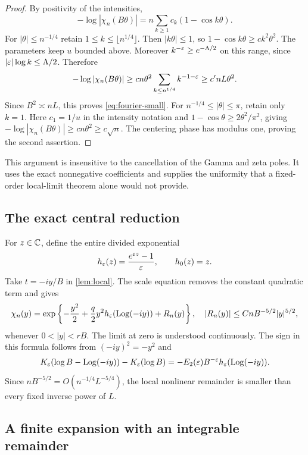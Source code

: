 \begin{proof}
By positivity of the intensities,
\[
 -\log|\chi_n(B\theta)|
  =n\sum_{k\ge1}c_k(1-\cos k\theta).
\]
For $|\theta|\le n^{-1/4}$ retain $1\le k\le\lfloor n^{1/4}\rfloor$.
Then $|k\theta|\le1$, so $1-\cos k\theta\ge c k^2\theta^2$.
The parameters keep $u$ bounded above. Moreover
$k^{-\varepsilon}\ge e^{-\Lambda/2}$ on this range, since
$|\varepsilon|\log k\le\Lambda/2$. Therefore
\[
 -\log|\chi_n(B\theta)|
 \ge c n\theta^2\sum_{k\le n^{1/4}}k^{-1-\varepsilon}
 \ge c' nL\theta^2.
\]
Since $B^2\asymp nL$, this proves \eqref{eq:fourier-small}.
For $n^{-1/4}\le|\theta|\le\pi$, retain only $k=1$.
Here $c_1=1/u$ in the intensity notation and
$1-\cos\theta\ge2\theta^2/\pi^2$, giving
$-\log|\chi_n(B\theta)|\ge c n\theta^2\ge c\sqrt n$.
The centering phase has modulus one, proving the second assertion.
\end{proof}

This argument is insensitive to the cancellation of the Gamma and
zeta poles. It uses the exact nonnegative coefficients and supplies
the uniformity that a fixed-order local-limit theorem alone would
not provide.

\subsection{The exact central reduction}

For $z\in\mathbb C$, define the entire divided exponential
\begin{equation}\label{eq:h-epsilon}
 h_\varepsilon(z)=\frac{e^{\varepsilon z}-1}{\varepsilon},\qquad h_0(z)=z.
\end{equation}
Take $t=-iy/B$ in \cref{lem:local}. The scale equation removes the
constant quadratic term and gives
\begin{equation}\label{eq:core-characteristic}
 \chi_n(y)=\exp\left\{
     -\frac{y^2}{2}+\frac q2y^2h_\varepsilon(\operatorname{Log}(-iy))+R_n(y)
                       \right\},
 \quad |R_n(y)|\le CnB^{-5/2}|y|^{5/2},
\end{equation}
whenever $0<|y|<rB$. The limit at zero is understood continuously.
The sign in this formula follows from
$(-iy)^2=-y^2$ and
\[
 K_\varepsilon(\log B-\operatorname{Log}(-iy))-K_\varepsilon(\log B)
   =-E_2(\varepsilon)B^{-\varepsilon}h_\varepsilon(\operatorname{Log}(-iy)).
\]
Since $nB^{-5/2}=O(n^{-1/4}L^{-5/4})$, the local nonlinear
remainder is smaller than every fixed inverse power of $L$.

\subsection{A finite expansion with an integrable remainder}

